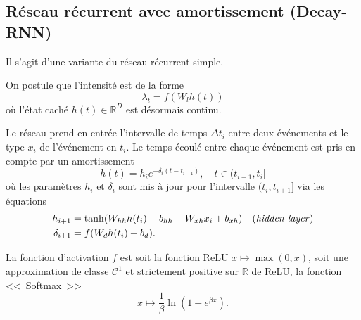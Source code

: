 \documentclass[11pt]{article}
\newcommand{\RR}{\mathbb{R}}
\begin{document}
\subsection{Réseau récurrent avec amortissement (Decay-RNN)}

Il s'agit d'une variante du réseau récurrent simple.

On postule que l'intensité est de la forme
\begin{equation}\label{eq:decayrnnhiddenstate}
	\lambda_t = f(W_l h(t))
\end{equation}
où l'état caché $h(t)\in\RR^D$ est désormais continu.

Le réseau prend en entrée l'intervalle de temps $\Delta t_i$ entre deux événements et le type $x_i$ de l'événement en $t_i$.
Le temps écoulé entre chaque événement est pris en compte par un amortissement
\begin{equation}
	h(t) = h_{i}e^{-\delta_i(t-t_{i-1})},\quad t\in(t_{i-1},t_i]
\end{equation}
où les paramètres $h_i$ et $\delta_i$ sont mis à jour pour l'intervalle $(t_i,t_{i+1}]$ via les équations
\begin{subequations}
\begin{align}
h_{i+1} &= \tanh(W_{hh}h(t_i) + b_{hh} + W_{xh}x_i + b_{xh})\quad\text{(\textit{hidden layer})} \\
\delta_{i+1} &= f(W_dh(t_i) + b_d).
\end{align}
\end{subequations}

La fonction d'activation $f$ est soit la fonction ReLU $x\mapsto \max(0,x)$, soit une approximation de classe $\mathcal C^1$ et strictement positive sur $\RR$ de ReLU, la fonction <<~Softmax~>>
\[
	x\mapsto \frac{1}{\beta}\ln(1+e^{\beta x}).
\]
\end{document}
